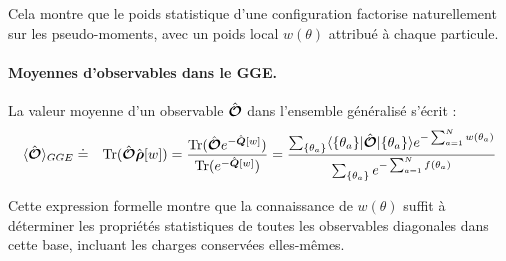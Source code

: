 Cela montre que le poids statistique d’une configuration factorise naturellement sur les pseudo-moments, avec un poids local $w(\theta)$ attribué à chaque particule.



\paragraph{Moyennes d'observables dans le GGE.}
La valeur moyenne d’un observable $\hat{\bm{\mathcal{O}}}$ dans l’ensemble généralisé s’écrit :
\begin{eqnarray}
	\langle \hat{\bm{\mathcal{O}}} \rangle_{GGE} & \doteq & \displaystyle  \text{Tr} (\hat{\bm{\mathcal{O}}}\hat{\bm{\rho}}[w]) = \frac{\text{Tr} (\hat{\bm{\mathcal{O}}}e^{-\hat{\bm{Q}}[w]})}{\text{Tr} (e^{-\hat{\bm{Q}}[w]})}	 = \frac{\sum_{\{\theta_a \}} \langle  \{ \theta_a\}  \vert   \hat{\bm{\mathcal{O}}} \vert \{ \theta_a\} \rangle e^{- \sum_{a = 1}^N w(\theta_a) }  }{\sum_{\{\theta_a  \}} e^{- \sum_{a = 1}^N  f(\theta_a) } }
\end{eqnarray}

Cette expression formelle montre que la connaissance de $w(\theta)$ suffit à déterminer les propriétés statistiques de toutes les observables diagonales dans cette base, incluant les charges conservées elles-mêmes.
	
	
